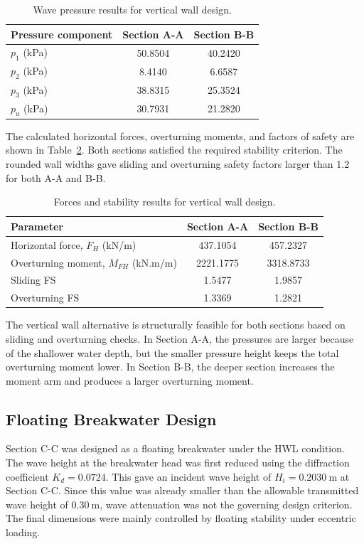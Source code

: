 \documentclass[a4paper, 11pt]{article}
\begin{document}
\begin{table}[H]
\centering
\caption{Wave pressure results for vertical wall design.}
\label{tab:vertical_pressures}
\begin{tabular}{l c c}
\hline
Pressure component & Section A-A & Section B-B \\
\hline
\(p_1\) (kPa) & 50.8504 & 40.2420 \\
\(p_2\) (kPa) & 8.4140 & 6.6587 \\
\(p_3\) (kPa) & 38.8315 & 25.3524 \\
\(p_u\) (kPa) & 30.7931 & 21.2820 \\
\hline
\end{tabular}
\end{table}

The calculated horizontal forces, overturning moments, and factors of safety are shown in Table~\ref{tab:vertical_stability}. Both sections satisfied the required stability criterion. The rounded wall widths gave sliding and overturning safety factors larger than 1.2 for both A-A and B-B.

\begin{table}[H]
\centering
\caption{Forces and stability results for vertical wall design.}
\label{tab:vertical_stability}
\begin{tabular}{l c c}
\hline
Parameter & Section A-A & Section B-B \\
\hline
Horizontal force, \(F_H\) (kN/m) & 437.1054 & 457.2327 \\
Overturning moment, \(M_{FH}\) (kN.m/m) & 2221.1775 & 3318.8733 \\
Sliding FS & 1.5477 & 1.9857 \\
Overturning FS & 1.3369 & 1.2821 \\
\hline
\end{tabular}
\end{table}

The vertical wall alternative is structurally feasible for both sections based on sliding and overturning checks. In Section A-A, the pressures are larger because of the shallower water depth, but the smaller pressure height keeps the total overturning moment lower. In Section B-B, the deeper section increases the moment arm and produces a larger overturning moment.


\subsection{Floating Breakwater Design}

\hspace*{0.5cm} Section C-C was designed as a floating breakwater under the HWL condition. The wave height at the breakwater head was first reduced using the diffraction coefficient \(K_d=0.0724\). This gave an incident wave height of \(H_i=0.2030~\mathrm{m}\) at Section C-C. Since this value was already smaller than the allowable transmitted wave height of \(0.30~\mathrm{m}\), wave attenuation was not the governing design criterion. The final dimensions were mainly controlled by floating stability under eccentric loading.
\end{document}
